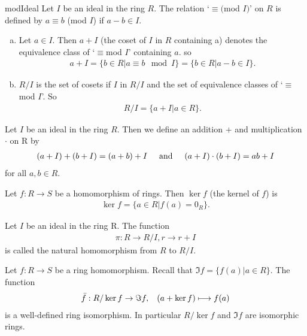 \begin{defn}{modIdeal}
	Let $I$ be an ideal in the ring $R$. The relation `$\equiv ($mod $I)$' on $R$ is defined by $a \equiv b$ (mod $I$) if $a-b \in I$.
\end{defn}
\begin{defn}{1}
	\begin{enumerate}[(a)]
		\item Let $a \in I$. Then $a+I$ (the coset of $I$ in $R$ containing a) denotes the equivalence class of `$\equiv $mod $I$' containing $a$. so
		\begin{align}
		a+I = \{b \in R| a \equiv b \mod I\} = \{b \in R| a-b \in I\}.
		\end{align}
		\item $R/I$ is the set of cosets if $I$ in $R/I$ and the set of equivalence classes of `$\equiv$ mod $I$'. So
		\begin{align}
		R/I=\{a+I|a \in R\}.
		\end{align} 
	\end{enumerate}
\end{defn}
\begin{defn}{}
	Let $I$ be an ideal in the ring $R$. Then we define an addition $+$ and multiplication $\cdot$ on R by
	\begin{align*}
	(a+I)+(b+I)=(a+b)+I \hspace{.5cm} \textrm{and}\hspace{0.5cm} (a+I)\cdot(b+I)=ab+I
	\end{align*}
	for all $a,b \in R$.
\end{defn}
\begin{defn}{1}
	Let $f: R\rightarrow S$ be a homomorphism of rings. Then $\ker f$ (the kernel of $f$) is
	\begin{align*}
	\ker f = \{a \in R | f(a)=0_R \}.
	\end{align*}
\end{defn}
\begin{defn}{1}
	Let $I$ be an ideal in the ring R. The function 
	\begin{align*}
	\pi: R \rightarrow R/I, r\rightarrow r+I
	\end{align*} 
	is called the natural homomorphism from $R$ to $R/I$.
\end{defn}
\begin{theo}{1}
	Let $f: R \rightarrow S$ be a ring homomorphism. Recall that $\Im f=\{f(a) |a \in R \}$. The function
	\begin{align}
	\bar{f}: R/\ker f \rightarrow \Im f, \hspace{.3 cm} (a+\ker f)\longmapsto f(a)
	\end{align}
	is a well-defined ring isomorphism. In particular $R/\ker f$ and $\Im f$ are isomorphic rings.
\end{theo}
